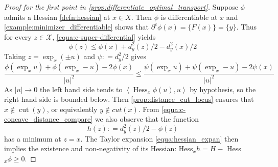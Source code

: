 \begin{proof}[Proof for the first point in \cref{prop:differentiate_optimal_transport}]
	Suppose \( \phi \) admits a Hessian \cref{defn:hessian} at \( x \in X \).
	Then \( \phi \) is differentiable at \( x \) and
	\cref{example:minimizer_differentiable} shows that \( \partial ^ { c } \phi ( x ) = \{ F ( x ) \} = \{ y \} \).
	Thus for every \( z \in \mathcal { X } \), \cref{equa:c-super-differential} yields
	\begin{equation}
		\label{equa:c-concave_distance_compare}
		\phi ( z ) \leq \phi ( x ) + d _ { y } ^ { 2 } ( z ) / 2 - d _ { y } ^ { 2 } ( x ) / 2
	\end{equation}
	Taking \( z = \exp _ { x } ( \pm u ) \) and \( \psi : = d _ { y } ^ { 2 } / 2 \) gives
	\[ \frac { \phi \left( \exp _ { x } u \right) + \phi \left( \exp _ { x } - u \right) - 2 \phi ( x ) } { | u | ^ { 2 } } \leq \frac { \psi \left( \exp _ { x } u \right) + \psi \left( \exp _ { x } - u \right) - 2 \psi ( x ) } { | u | ^ { 2 } } \]
	As \( | u | \rightarrow 0 \) the left hand side tends to \( \left\langle \operatorname { Hess } _ { x } \phi ( u ) , u \right\rangle \) by hypothesis, so the right hand side is bounded below.
	Then \cref{prop:distance_cut_locus} ensures that
	\( x \notin \operatorname { cut } ( y ) \), or equivalently \( y \notin c u t ( x ) \).
	From \cref{equa:c-concave_distance_compare} we also observe that the function
	\begin{equation}
		\label{proof:h_definition}
		h ( z ) : = d _ { y } ^ { 2 } ( z ) / 2 - \phi ( z )
	\end{equation}
	has a minimum at \( z = x \). The Taylor expansion \cref{equa:hessian_expan} then implies the
	existence and non-negativity of its Hessian: Hess\(_{ x } h = H - \) Hess\(_ { x } \phi \geq 0\).
\end{proof}

